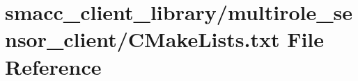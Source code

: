 \hypertarget{client__library_2multirole__sensor__client_2CMakeLists_8txt}{}\section{smacc\+\_\+client\+\_\+library/multirole\+\_\+sensor\+\_\+client/\+C\+Make\+Lists.txt File Reference}
\label{client__library_2multirole__sensor__client_2CMakeLists_8txt}
